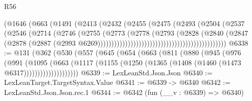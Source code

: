 \begin{lexlean}{R56}
\begin{coremodule}
                                                    (@1646
                                                      (@663
                                                        (@1491
                                                          (@2413
                                                            (@2432
                                                              (@2455
                                                                (@2475
                                                                  (@2493
                                                                    (@2504
                                                                      (@2537
                                                                        (@2546
                                                                          (@2714
                                                                            (@2746
                                                                              (@2755
                                                                                (@2773
                                                                                  (@2778
                                                                                    (@2793
                                                                                      (@2828
                                                                                        (@2840
                                                                                          (@2847
                                                                                            (@2878
                                                                                              (@2887
                                                                                                (@2993
                                                                                                  @6269)))))))))))))))))))))))))))))))))))))))))))))))
@6338 := @131
    (@362
      (@530
        (@557
          (@645
            (@654
              (@663
                (@811
                  (@880
                    (@945
                      (@976
                        (@991
                          (@1095
                            (@663
                              (@1117
                                (@1155 (@1250 (@1365 (@1408 (@1460 (@1473 @6317))))))))))))))))))))
@6339 := LexLeanStd.Json.Json
@6340 := LexLeanTarget.TargetSyntax.Value
@6341 := @6339 -> @6340
@6342 := LexLeanStd.Json.Json.rec.{1}
@6344 := @6342 (fun (__v : @6339) => @6340)

\end{coremodule}
\end{lexlean}
